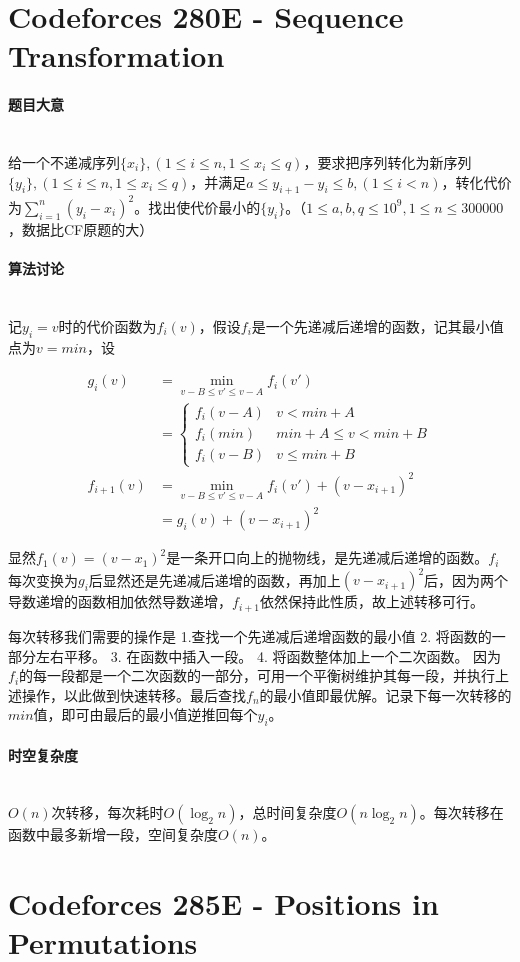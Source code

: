 \documentclass[UTF8]{ctexart}
\newcommand{\myparagraph}[1]{\paragraph{#1}\mbox{}\\}
\theoremstyle{nonumberplain}
\begin{document}
	\section{Codeforces 280E - Sequence Transformation}
	
		\myparagraph{题目大意}
		
			给一个不递减序列$\{x_i\},(1 \leq i \leq n, 1 \leq x_i \leq q)$，要求把序列转化为新序列$\{y_i\},(1 \leq i \leq n, 1 \leq x_i \leq q)$，并满足$a \leq y_{i+1}-y_i \leq b,(1 \leq i < n)$，转化代价为$\sum_{i=1}^n(y_i-x_i)^2$。找出使代价最小的$\{y_i\}$。（$1 \leq a,b,q \leq 10^9, 1 \leq n \leq 300000$，数据比CF原题的大）
		
		\myparagraph{算法讨论}
			
			记$y_i=v$时的代价函数为$f_i(v)$，假设$f_i$是一个先递减后递增的函数，记其最小值点为$v=min$，设
			
			$$\begin{aligned}
				g_i(v)&=\min_{v-B \leq v' \leq v-A}f_i(v')\\
				      &=\begin{cases}
				           f_i(v-A) & v < min+A \\
						   f_i(min) & min+A \leq v < min+B \\
						   f_i(v-B) & v \leq min+B
						\end{cases} \\
				f_{i+1}(v)&=\min_{v-B \leq v' \leq v-A}f_i(v')+(v-x_{i+1})^2 \\
				          &=g_i(v)+(v-x_{i+1})^2
			\end{aligned}$$
			
			显然$f_1(v)=(v-x_1)^2$是一条开口向上的抛物线，是先递减后递增的函数。$f_i$每次变换为$g_i$后显然还是先递减后递增的函数，再加上$(v-x_{i+1})^2$后，因为两个导数递增的函数相加依然导数递增，$f_{i+1}$依然保持此性质，故上述转移可行。
			
			每次转移我们需要的操作是 1.查找一个先递减后递增函数的最小值 2. 将函数的一部分左右平移。 3. 在函数中插入一段。 4. 将函数整体加上一个二次函数。 因为$f_i$的每一段都是一个二次函数的一部分，可用一个平衡树维护其每一段，并执行上述操作，以此做到快速转移。最后查找$f_n$的最小值即最优解。记录下每一次转移的$min$值，即可由最后的最小值逆推回每个$y_i$。
			
		\myparagraph{时空复杂度}
		
			$O(n)$次转移，每次耗时$O(\log_2n)$，总时间复杂度$O(n\log_2n)$。每次转移在函数中最多新增一段，空间复杂度$O(n)$。
	
	\section{Codeforces 285E - Positions in Permutations}
	
\end{document}

